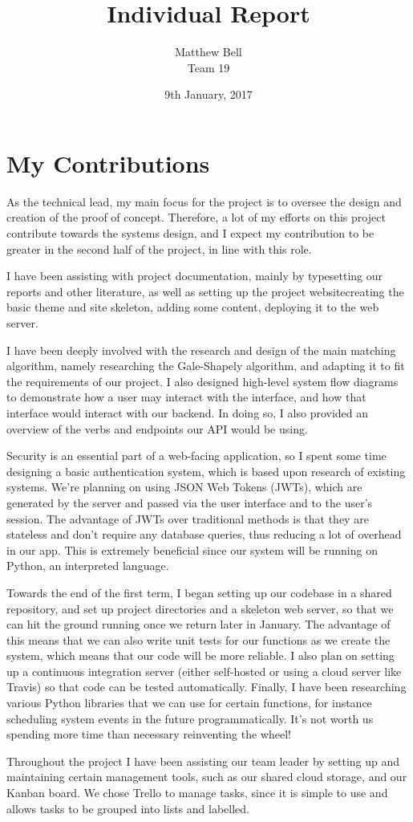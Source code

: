 \documentclass[14pt]{report}
\title{Individual Report}
\date{9th January, 2017}
\author{Matthew Bell\\ Team 19}
\begin{document}
    \maketitle

    \section*{My Contributions}
    As the technical lead, my main focus for the project is to oversee the design and creation of the proof of concept. Therefore, a lot of my efforts on this project contribute towards the systems design, and I expect my contribution to be greater in the second half of the project, in line with this role.

    I have been assisting with project documentation, mainly by typesetting our reports and other literature, as well as setting up the project website\textemdash creating the basic theme and site skeleton, adding some content, deploying it to the web server.

    I have been deeply involved with the research and design of the main matching algorithm, namely researching the Gale-Shapely algorithm, and adapting it to fit the requirements of our project. I also designed high-level system flow diagrams to demonstrate how a user may interact with the interface, and how that interface would interact with our backend. In doing so, I also provided an overview of the verbs and endpoints our API would be using.

    Security is an essential part of a web-facing application, so I spent some time designing a basic authentication system, which is based upon research of existing systems. We're planning on using JSON Web Tokens (JWTs), which are generated by the server and passed via the user interface and to the user's session. The advantage of JWTs over traditional methods is that they are stateless and don't require any database queries, thus reducing a lot of overhead in our app. This is extremely beneficial since our system will be running on Python, an interpreted language.

    Towards the end of the first term, I began setting up our codebase in a shared repository, and set up project directories and a skeleton web server, so that we can hit the ground running once we return later in January. The advantage of this means that we can also write unit tests for our functions as we create the system, which means that our code will be more reliable. I also plan on setting up a continuous integration server (either self-hosted or using a cloud server like Travis) so that code can be tested automatically. Finally, I have been researching various Python libraries that we can use for certain functions, for instance scheduling system events in the future programmatically. It's not worth us spending more time than necessary reinventing the wheel!

    Throughout the project I have been assisting our team leader by setting up and maintaining certain management tools, such as our shared cloud storage, and our Kanban board. We chose Trello to manage tasks, since it is simple to use and allows tasks to be grouped into lists and labelled.
\end{document}
